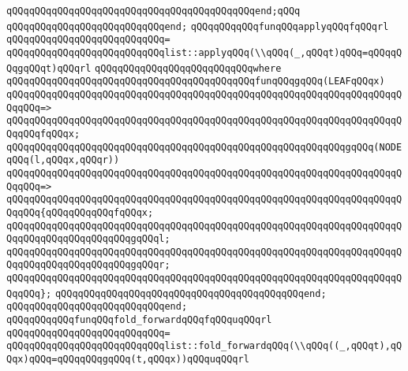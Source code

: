 \verb|qQQqqQQqqQQqqQQqqQQqqQQqqQQqqQQqqQQqqQQqqQQqend;qQQq|\newline
\verb|qQQqqQQqqQQqqQQqqQQqqQQqqQQqend;|\newline
\newline
\verb|qQQqqQQqqQQqfunqQQqapplyqQQqfqQQqrl|\newline
\verb|qQQqqQQqqQQqqQQqqQQqqQQqqQQq=|\newline
\verb|qQQqqQQqqQQqqQQqqQQqqQQqqQQqlist::applyqQQq(\\qQQq(_,qQQqt)qQQq=qQQqqQQqgqQQqt)qQQqrl|\newline
\verb|qQQqqQQqqQQqqQQqqQQqqQQqqQQqwhere|\newline
\verb|qQQqqQQqqQQqqQQqqQQqqQQqqQQqqQQqqQQqqQQqqQQqfunqQQqgqQQq(LEAFqQQqx)|\newline
\verb|qQQqqQQqqQQqqQQqqQQqqQQqqQQqqQQqqQQqqQQqqQQqqQQqqQQqqQQqqQQqqQQqqQQqqQQqqQQq=>|\newline
\verb|qQQqqQQqqQQqqQQqqQQqqQQqqQQqqQQqqQQqqQQqqQQqqQQqqQQqqQQqqQQqqQQqqQQqqQQqqQQqfqQQqx;|\newline
\newline
\verb|qQQqqQQqqQQqqQQqqQQqqQQqqQQqqQQqqQQqqQQqqQQqqQQqqQQqqQQqqQQqgqQQq(NODEqQQq(l,qQQqx,qQQqr))|\newline
\verb|qQQqqQQqqQQqqQQqqQQqqQQqqQQqqQQqqQQqqQQqqQQqqQQqqQQqqQQqqQQqqQQqqQQqqQQqqQQq=>|\newline
\verb|qQQqqQQqqQQqqQQqqQQqqQQqqQQqqQQqqQQqqQQqqQQqqQQqqQQqqQQqqQQqqQQqqQQqqQQqqQQq{qQQqqQQqqQQqfqQQqx;|\newline
\verb|qQQqqQQqqQQqqQQqqQQqqQQqqQQqqQQqqQQqqQQqqQQqqQQqqQQqqQQqqQQqqQQqqQQqqQQqqQQqqQQqqQQqqQQqqQQqgqQQql;|\newline
\verb|qQQqqQQqqQQqqQQqqQQqqQQqqQQqqQQqqQQqqQQqqQQqqQQqqQQqqQQqqQQqqQQqqQQqqQQqqQQqqQQqqQQqqQQqqQQqgqQQqr;|\newline
\verb|qQQqqQQqqQQqqQQqqQQqqQQqqQQqqQQqqQQqqQQqqQQqqQQqqQQqqQQqqQQqqQQqqQQqqQQqqQQq};|\newline
\verb|qQQqqQQqqQQqqQQqqQQqqQQqqQQqqQQqqQQqqQQqqQQqend;|\newline
\verb|qQQqqQQqqQQqqQQqqQQqqQQqqQQqend;|\newline
\newline
\verb|qQQqqQQqqQQqfunqQQqfold_forwardqQQqfqQQquqQQqrl|\newline
\verb|qQQqqQQqqQQqqQQqqQQqqQQqqQQq=|\newline
\verb|qQQqqQQqqQQqqQQqqQQqqQQqqQQqlist::fold_forwardqQQq(\\qQQq((_,qQQqt),qQQqx)qQQq=qQQqqQQqgqQQq(t,qQQqx))qQQquqQQqrl|\newline
